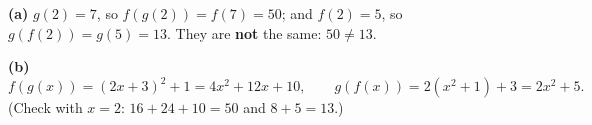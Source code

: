 \textbf{(a)} $g(2)=7$, so $f(g(2))=f(7)=50$; and $f(2)=5$, so $g(f(2))=g(5)=13$. They are \textbf{not} the same: $\boxed{50\ne13}$.

\textbf{(b)}
\[f(g(x))=(2x+3)^2+1=\boxed{4x^2+12x+10},\qquad g(f(x))=2\left(x^2+1\right)+3=\boxed{2x^2+5}.\]
(Check with $x=2$: $16+24+10=50$ and $8+5=13$.)
